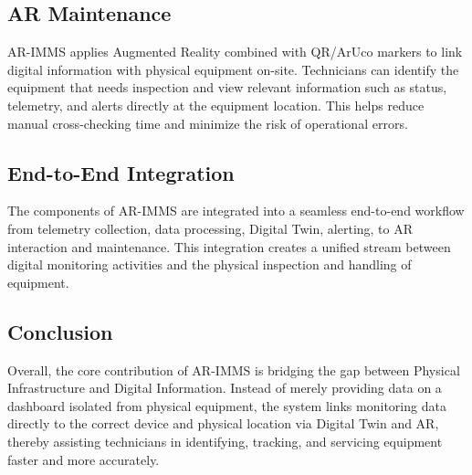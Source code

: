\subsection{AR Maintenance}
AR-IMMS applies Augmented Reality combined with QR/ArUco markers to link digital information with physical equipment on-site. Technicians can identify the equipment that needs inspection and view relevant information such as status, telemetry, and alerts directly at the equipment location. This helps reduce manual cross-checking time and minimize the risk of operational errors.

\subsection{End-to-End Integration}
The components of AR-IMMS are integrated into a seamless end-to-end workflow from telemetry collection, data processing, Digital Twin, alerting, to AR interaction and maintenance. This integration creates a unified stream between digital monitoring activities and the physical inspection and handling of equipment.

\subsection*{Conclusion}
Overall, the core contribution of AR-IMMS is bridging the gap between Physical Infrastructure and Digital Information. Instead of merely providing data on a dashboard isolated from physical equipment, the system links monitoring data directly to the correct device and physical location via Digital Twin and AR, thereby assisting technicians in identifying, tracking, and servicing equipment faster and more accurately.

